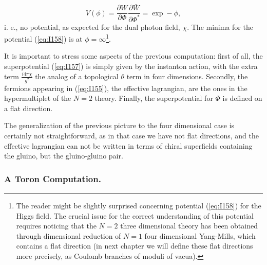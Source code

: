 \begin{equation}
V(\phi) = \frac {\partial W}{\partial \Phi} \frac {\partial
\bar{W}}{\partial \Phi^*} = \exp - \phi,
\label{eq:I158}
\end{equation}
i. e., no potential, as expected for the dual photon field,
$\chi$. The minima for the potential (\ref{eq:I158}) is at
$\phi=\infty$\footnote{The reader might be slightly surprised
concerning potential (\ref{eq:I158}) for the Higgs field. The
crucial issue for the correct understanding of this potential
requires noticing that the $N\!=\!2$ three dimensional
theory has been obtained through dimensional reduction of
$N\!=\!1$ four dimensional Yang-Mills, which contains a flat
direction (in next chapter we will define these flat directions
more precisely, as Coulomb branches of moduli of vacua).}.
  
It is important to stress some aspects of the previous
computation: first of all, the superpotential (\ref{eq:I157}) is
simply given by the instanton action, with the extra term $\frac
{i 4 \pi \chi}{g^2}$ the analog of a topological $\theta$ term
in four dimensions. Secondly, the fermions appearing in
(\ref{eq:I155}), the effective lagrangian, are the ones in the
hypermultiplet of the $N\!=\!2$ theory. Finally, the
superpotential for $\Phi$ is defined on a flat direction.
  
The generalization of the previous picture to the four
dimensional case is certainly not straightforward, as in that
case we have not flat directions, and the effective lagrangian
can not be written in terms of chiral superfields containing the
gluino, but the gluino-gluino pair.


\subsubsection{A Toron Computation.}

